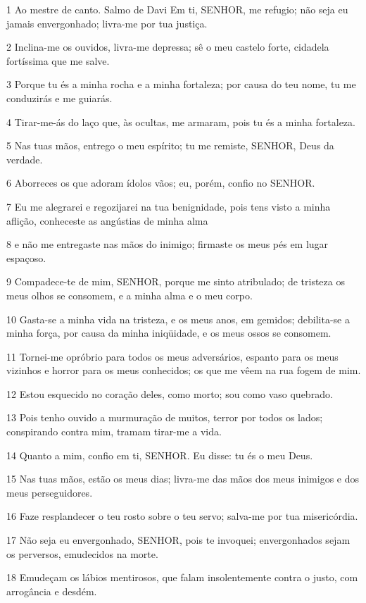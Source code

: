 \par 1 Ao mestre de canto. Salmo de Davi Em ti, SENHOR, me refugio; não seja eu jamais envergonhado; livra-me por tua justiça.
\par 2 Inclina-me os ouvidos, livra-me depressa; sê o meu castelo forte, cidadela fortíssima que me salve.
\par 3 Porque tu és a minha rocha e a minha fortaleza; por causa do teu nome, tu me conduzirás e me guiarás.
\par 4 Tirar-me-ás do laço que, às ocultas, me armaram, pois tu és a minha fortaleza.
\par 5 Nas tuas mãos, entrego o meu espírito; tu me remiste, SENHOR, Deus da verdade.
\par 6 Aborreces os que adoram ídolos vãos; eu, porém, confio no SENHOR.
\par 7 Eu me alegrarei e regozijarei na tua benignidade, pois tens visto a minha aflição, conheceste as angústias de minha alma
\par 8 e não me entregaste nas mãos do inimigo; firmaste os meus pés em lugar espaçoso.
\par 9 Compadece-te de mim, SENHOR, porque me sinto atribulado; de tristeza os meus olhos se consomem, e a minha alma e o meu corpo.
\par 10 Gasta-se a minha vida na tristeza, e os meus anos, em gemidos; debilita-se a minha força, por causa da minha iniqüidade, e os meus ossos se consomem.
\par 11 Tornei-me opróbrio para todos os meus adversários, espanto para os meus vizinhos e horror para os meus conhecidos; os que me vêem na rua fogem de mim.
\par 12 Estou esquecido no coração deles, como morto; sou como vaso quebrado.
\par 13 Pois tenho ouvido a murmuração de muitos, terror por todos os lados; conspirando contra mim, tramam tirar-me a vida.
\par 14 Quanto a mim, confio em ti, SENHOR. Eu disse: tu és o meu Deus.
\par 15 Nas tuas mãos, estão os meus dias; livra-me das mãos dos meus inimigos e dos meus perseguidores.
\par 16 Faze resplandecer o teu rosto sobre o teu servo; salva-me por tua misericórdia.
\par 17 Não seja eu envergonhado, SENHOR, pois te invoquei; envergonhados sejam os perversos, emudecidos na morte.
\par 18 Emudeçam os lábios mentirosos, que falam insolentemente contra o justo, com arrogância e desdém.
